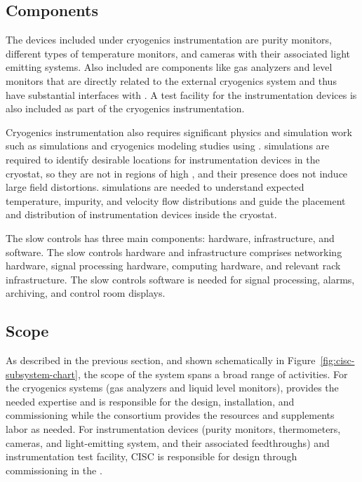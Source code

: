 \subsection{Components}

The devices included under cryogenics instrumentation are purity monitors,  different types of temperature monitors, and cameras with their associated light emitting systems. Also included are components like gas analyzers and \lar level monitors that are directly related to the external cryogenics system and thus have substantial interfaces with . A test facility for the instrumentation devices is also included as part of the cryogenics instrumentation.

Cryogenics instrumentation also requires significant physics and
simulation work such as \efield simulations and cryogenics modeling
studies using . \efield simulations
are required to identify desirable locations for instrumentation
devices in the cryostat, so they are not in regions of high \efield, and their presence does not induce large field distortions. 
 simulations are needed to understand expected temperature, impurity, and velocity flow distributions and guide the placement and distribution of instrumentation devices inside the cryostat.

The slow controls has three main components: hardware, infrastructure, and software. The slow controls hardware and infrastructure comprises networking hardware, signal processing hardware, computing hardware, and relevant rack infrastructure. The slow controls software is needed for signal processing, alarms, archiving, and control room displays.

\subsection{Scope}

As described in the previous section, and shown schematically in Figure~\ref{fig:cisc-subsystem-chart}, the scope of the  system spans a broad range of activities. For the cryogenics systems (gas analyzers and liquid level monitors),  provides the needed expertise and is responsible for the design, installation, and commissioning while the  consortium provides the resources and supplements labor as needed. For  instrumentation devices (purity monitors, thermometers, cameras, and light-emitting system, and their associated feedthroughs) and instrumentation test facility, CISC is responsible for design through commissioning in the .

